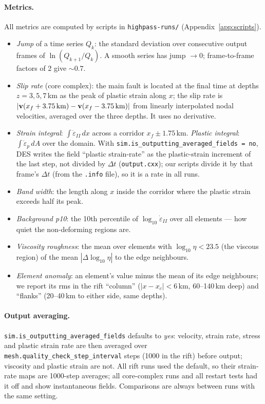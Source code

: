 \documentclass[11pt]{article}
\newcommand{\edot}{\dot\varepsilon_{II}}
\newcommand{\code}[1]{\texttt{#1}}
\begin{document}
\paragraph{Metrics.} All metrics are computed by scripts in \code{highpass-runs/}
(Appendix~\ref{app:scripts}).
\begin{itemize}
\item \emph{Jump} of a time series $Q_k$: the standard deviation over consecutive output frames
  of $\ln(Q_{k+1}/Q_k)$. A smooth series has jump $\to0$; frame-to-frame factors of 2 give
  $\sim0.7$.
\item \emph{Slip rate} (core complex): the main fault is located at the final time at depths
  $z=3,5,7$\,km as the peak of plastic strain along $x$; the slip rate is
  $|\mathbf v(x_f+3.75\,{\rm km})-\mathbf v(x_f-3.75\,{\rm km})|$ from linearly interpolated nodal
  velocities, averaged over the three depths. It uses no derivative.
\item \emph{Strain integral}: $\int\edot\,dx$ across a corridor $x_f\pm1.75$\,km.
  \emph{Plastic integral}: $\int\dot\varepsilon_p\,dA$ over the domain. With
  \code{sim.is\_outputting\_averaged\_fields = no}, DES writes the field ``plastic strain-rate''
  as the plastic-strain increment of the last step, not divided by $\Delta t$ (\code{output.cxx});
  our scripts divide it by that frame's $\Delta t$ (from the \code{.info} file), so it is a rate
  in all runs.
\item \emph{Band width}: the length along $x$ inside the corridor where the plastic strain exceeds
  half its peak.
\item \emph{Background p10}: the 10th percentile of $\log_{10}\edot$ over all elements --- how quiet
  the non-deforming regions are.
\item \emph{Viscosity roughness}: the mean over elements with $\log_{10}\eta<23.5$ (the viscous
  region) of the mean $|\Delta\log_{10}\eta|$ to the edge neighbours.
\item \emph{Element anomaly}: an element's value minus the mean of its edge neighbours; we report
  its rms in the rift ``column'' ($|x-x_c|<6$\,km, 60--140\,km deep) and ``flanks'' (20--40\,km to
  either side, same depths).
\end{itemize}

\paragraph{Output averaging.} \code{sim.is\_outputting\_averaged\_fields} defaults to \emph{yes}:
velocity, strain rate, stress and plastic strain rate are then averaged over
\code{mesh.quality\_check\_step\_interval} steps (1000 in the rift) before output; viscosity and
plastic strain are not. All rift runs used the default, so their strain-rate maps are 1000-step
averages; all core-complex runs and all restart tests had it off and show instantaneous fields.
Comparisons are always between runs with the same setting.
\end{document}

